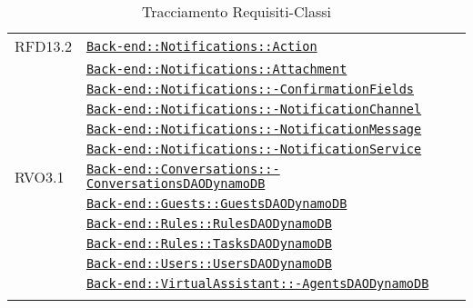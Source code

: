 \begin{longtable}{|>{\centering}m{3cm}|m{10cm}<{\centering}|}
RFD13.2 & \hyperref[Back-end::Notifications::Action]{\texttt{Back-end::Notifications::Action}}\\
& \hyperref[Back-end::Notifications::Attachment]{\texttt{Back-end::Notifications::Attachment}}\\
& \hyperref[Back-end::Notifications::ConfirmationFields]{\texttt{Back-end::Notifications::-\linebreak ConfirmationFields}}\\
& \hyperref[Back-end::Notifications::NotificationChannel]{\texttt{Back-end::Notifications::-\linebreak NotificationChannel}}\\
& \hyperref[Back-end::Notifications::NotificationMessage]{\texttt{Back-end::Notifications::-\linebreak NotificationMessage}}\\
& \hyperref[Back-end::Notifications::NotificationService]{\texttt{Back-end::Notifications::-\linebreak NotificationService}}\\ \hline

RVO3.1 & \hyperref[Back-end::Conversations::ConversationsDAODynamoDB]{\texttt{Back-end::Conversations::-\linebreak ConversationsDAODynamoDB}}\\
& \hyperref[Back-end::Guests::GuestsDAODynamoDB]{\texttt{Back-end::Guests::GuestsDAODynamoDB}}\\
& \hyperref[Back-end::Rules::RulesDAODynamoDB]{\texttt{Back-end::Rules::RulesDAODynamoDB}}\\
& \hyperref[Back-end::Rules::TasksDAODynamoDB]{\texttt{Back-end::Rules::TasksDAODynamoDB}}\\
& \hyperref[Back-end::Users::UsersDAODynamoDB]{\texttt{Back-end::Users::UsersDAODynamoDB}}\\
& \hyperref[Back-end::VirtualAssistant::AgentsDAODynamoDB]{\texttt{Back-end::VirtualAssistant::-\linebreak AgentsDAODynamoDB}}\\ \hline

\caption[Tracciamento Requisiti-Classi]{Tracciamento Requisiti-Classi}
\label{tabella:requi-class}
\end{longtable}
\clearpage
